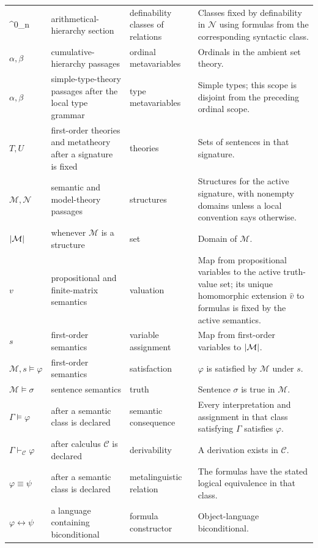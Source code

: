 \documentclass[11pt,oneside,openany]{book}
\theoremstyle{definition}
\theoremstyle{plain}
\theoremstyle{remark}
\DeclarePairedDelimiter{\abs}{\lvert}{\rvert}
\newcommand{\entails}{\models}
\newcommand{\derives}{\vdash}
\begin{document}
\begin{longtable}{@{}p{}p{}p{}p{}@{}}
\boldsymbol{\Delta}^0_n\) & arithmetical-hierarchy section & definability
classes of relations & Classes fixed by definability in \(\mathcal N\) using
formulas from the corresponding syntactic class. \\
\(\alpha,\beta\) & cumulative-hierarchy passages & ordinal metavariables &
Ordinals in the ambient set theory. \\
\(\alpha,\beta\) & simple-type-theory passages after the local type grammar &
type metavariables & Simple types; this scope is disjoint from the preceding
ordinal scope. \\
\(T,U\) & first-order theories and metatheory after a signature is fixed &
theories & Sets of sentences in that signature. \\
\(\mathcal M,\mathcal N\) & semantic and model-theory passages & structures &
Structures for the active signature, with nonempty domains unless a local
convention says otherwise. \\
\(\abs{\mathcal M}\) & whenever \(\mathcal M\) is a structure & set & Domain
of \(\mathcal M\). \\
\(v\) & propositional and finite-matrix semantics & valuation & Map from
propositional variables to the active truth-value set; its unique
homomorphic extension \(\widehat v\) to formulas is fixed by the active
semantics. \\
\(s\) & first-order semantics & variable assignment & Map from first-order
variables to \(\abs{\mathcal M}\). \\
\(\mathcal M,s\entails\varphi\) & first-order semantics & satisfaction &
\(\varphi\) is satisfied by \(\mathcal M\) under \(s\). \\
\(\mathcal M\entails\sigma\) & sentence semantics & truth & Sentence \(\sigma\)
is true in \(\mathcal M\). \\
\(\Gamma\entails\varphi\) & after a semantic class is declared & semantic
consequence & Every interpretation and assignment in that class satisfying
\(\Gamma\) satisfies \(\varphi\). \\
\(\Gamma\derives_{\mathcal C}\varphi\) & after calculus \(\mathcal C\) is
declared & derivability & A derivation exists in \(\mathcal C\). \\
\(\varphi\equiv\psi\) & after a semantic class is declared & metalinguistic
relation & The formulas have the stated logical equivalence in that class. \\
\(\varphi\leftrightarrow\psi\) & a language containing biconditional & formula
constructor & Object-language biconditional. \\

\end{longtable}
\end{document}
